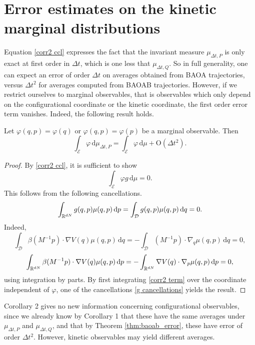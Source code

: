 \section{Error estimates on the kinetic marginal distributions}\label{second order on the marginals}
Equation \eqref{corr2 ccl} expresses the fact that the invariant measure $\mu_{\Delta t,P}$ is only exact at first order in $\Delta t$, which is one less that $\mu_{\Delta t,Q}$.
So in full generality, one can expect an error of order $\Delta t$ on averages obtained from BAOA trajectories, versus $\Delta t^2$ for averages computed from BAOAB trajectories. However, if we restrict ourselves to marginal observables, that is observables which only depend on the configurational coordinate or the kinetic coordinate, the first order error term vanishes.
Indeed, the following result holds.
\begin{corollary}\label{corr3 second order marginals}
Let $\varphi(q,p)=\varphi(q)$ or $\varphi(q,p)=\varphi(p)$ be a marginal observable. Then
$$\int_{\mathcal E}\varphi\, \mathrm{d} \mu_{\Delta t,P}=\int_{\mathcal E}\varphi\, \mathrm{d}\mu +\mathrm{O}(\Delta t^2).$$
\end{corollary}
\begin{proof}
  By \eqref{corr2 ccl}, it is sufficient to show
  \begin{equation}\label{corr2 term}\int_{\mathcal E}\varphi g\, \mathrm{d}\mu=0.\end{equation}
  This follows from the following cancellations.
  \begin{equation}
    \label{g cancellations}
      \int_{\mathbb{R}^{dN}}g(q,p)\mu(q,p)\,\mathrm{d}p=\int_{\mathcal D}g(q,p)\mu(q,p)\,\mathrm{d}q=0.
  \end{equation}
  Indeed,
$$\int_{\mathcal D}\beta(M^{-1}p)\cdot \nabla V(q)\mu(q,p)\,\mathrm{d}q=-\int_{\mathcal D}(M^{-1}p)\cdot \nabla_q\mu(q,p)\,\mathrm{d}q=0,$$
$$\int_{\mathbb{R}^{dN}}\beta(M^{-1}p)\cdot \nabla V(q)\mu(q,p)\,\mathrm{d}p=-\int_{\mathbb{R}^{dN}}\nabla V(q)\cdot\nabla_p\mu(q,p)\,\mathrm{d}p=0,$$
using integration by parts. By first integrating \eqref{corr2 term} over the coordinate independent of $\varphi$, one of the cancellations \eqref{g cancellations} yields the result.
\end{proof}

Corollary 2 gives no new information concerning configurational observables, since we already know by Corollary 1 that these have the same averages under $\mu_{\Delta t,P}$ and $\mu_{\Delta t,Q}$, and that by Theorem \ref{thm:baoab_error}, these have error of order $\Delta t^2$.
However, kinetic observables may yield different averages.

